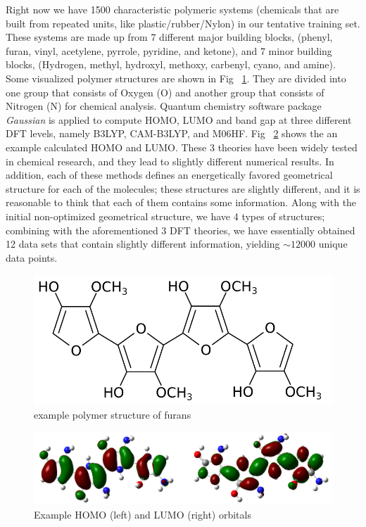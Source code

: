 \documentclass[12pt, oneside]{article}   	%
\begin{document}
\noindent Right now we have 1500 characteristic polymeric systems (chemicals that are built from repeated units, like plastic/rubber/Nylon) in our tentative training set. These systems are made up from 7 different major building blocks, (phenyl, furan, vinyl, acetylene, pyrrole, pyridine, and ketone), and 7 minor building blocks, (Hydrogen, methyl, hydroxyl, methoxy, carbenyl, cyano, and amine). Some visualized polymer structures are shown in Fig ~\ref{furan}. They are divided into one group that consists of Oxygen (O) and another group that consists of Nitrogen (N) for chemical analysis. Quantum chemistry software package \textit{Gaussian} \cite{gaussian} is applied to compute HOMO, LUMO and band gap at three different DFT levels, namely B3LYP, CAM-B3LYP, and M06HF. Fig ~\ref{orbital} shows the an example calculated HOMO and LUMO. These 3 theories have been widely tested in chemical research, and they lead to slightly different numerical results. In addition, each of these methods defines an energetically favored geometrical structure for each of the molecules; these structures are slightly different, and it is reasonable to think that each of them contains some information. Along with the initial non-optimized geometrical structure, we have 4 types of structures; combining with the aforementioned 3 DFT theories, we have essentially obtained 12 data sets that contain slightly different information, yielding $\sim12000$ unique data points. \\

\begin{figure}[hb]
\begin{center}
\includegraphics [width=.1\textwidth]{furan.png}
\caption{example polymer structure of furans}\label{furan}
\end{center}
\end{figure}

\begin{figure}[hb]
\begin{center}
\includegraphics [width=1\textwidth]{orbital.png}
\caption{Example HOMO (left) and LUMO (right) orbitals}\label{orbital}
\end{center}
\end{figure}
\end{document}
